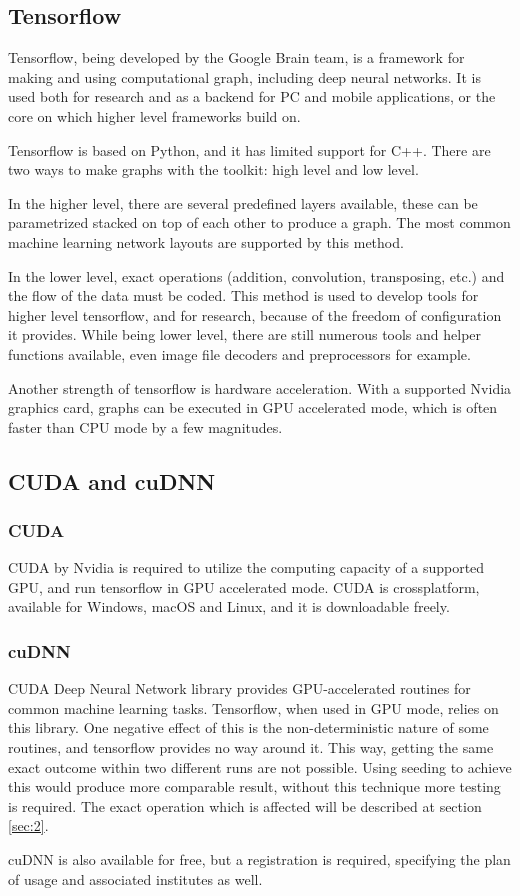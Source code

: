 \documentclass[12pt]{report}
\begin{document}
\subsection{Tensorflow}
Tensorflow, being developed by the Google Brain team, is a framework for making and using computational graph, including deep neural networks. It is used both for research and as a backend for PC and mobile applications, or the core on which higher level frameworks build on.\par
Tensorflow is based on Python, and it has limited support for C++. There are two ways to make graphs with the toolkit: high level and low level.\par
In the higher level, there are several predefined layers available, these can be parametrized stacked on top of each other to produce a graph. The most common machine learning network layouts are supported by this method.\par
In the lower level, exact operations (addition, convolution, transposing, etc.) and the flow of the data must be coded. This method is used to develop tools for higher level tensorflow, and for research, because of the freedom of configuration it provides. While being lower level, there are still numerous tools and helper functions available, even image file decoders and preprocessors for example.\par
Another strength of tensorflow is hardware acceleration. With a supported Nvidia graphics card, graphs can be executed in GPU accelerated mode, which is often faster than CPU mode by a few magnitudes.
\subsection{CUDA and cuDNN}
\subsubsection{CUDA}
CUDA by Nvidia is required to utilize the computing capacity of a supported GPU, and run tensorflow in GPU accelerated mode. CUDA is crossplatform, available for 	Windows, macOS and Linux, and it is downloadable freely.
\subsubsection{cuDNN} \label{sec:1}
CUDA Deep Neural Network library provides GPU-accelerated routines for common machine learning tasks. Tensorflow, when used in GPU mode, relies on this library. One negative effect of this is the non-deterministic nature of some routines, and tensorflow provides no way around it. This way, getting the same exact outcome within two different runs are not possible. Using seeding to achieve this would produce more comparable result, without this technique more testing is required. The exact operation which is affected will be described at section \ref{sec:2}.\par
cuDNN is also available for free, but a registration is required, specifying the plan of usage and associated institutes as well.
\end{document}
